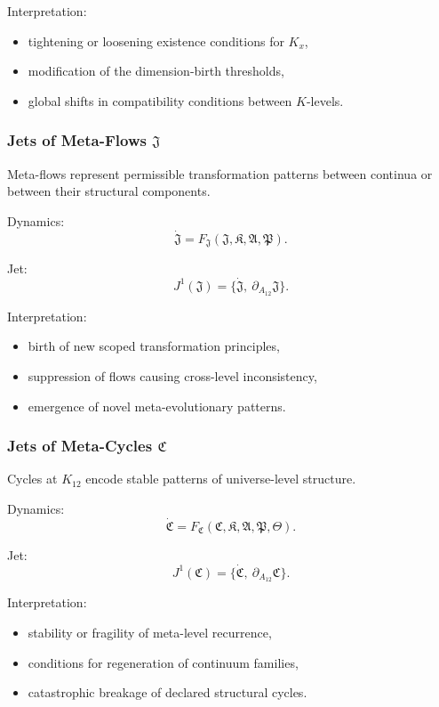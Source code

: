 Interpretation:
\begin{itemize}
    \item tightening or loosening existence conditions for $K_x$,
    \item modification of the dimension-birth thresholds,
    \item global shifts in compatibility conditions between $K$-levels.
\end{itemize}


\subsubsection{Jets of Meta-Flows $\mathfrak{J}$}

Meta-flows represent permissible transformation patterns between
continua or between their structural components.

Dynamics:
\[
\dot{\mathfrak{J}}
=
F_{\mathfrak{J}}(\mathfrak{J},\mathfrak{K},\mathfrak{A},\mathfrak{P}).
\]

Jet:
\[
J^1(\mathfrak{J})
= \{\dot{\mathfrak{J}},\ \partial_{A_{12}}\mathfrak{J}\}.
\]

Interpretation:
\begin{itemize}
    \item birth of new scoped transformation principles,
    \item suppression of flows causing cross-level inconsistency,
    \item emergence of novel meta-evolutionary patterns.
\end{itemize}


\subsubsection{Jets of Meta-Cycles $\mathfrak{C}$}

Cycles at $K_{12}$ encode stable patterns of universe-level structure.

Dynamics:
\[
\dot{\mathfrak{C}}
=
F_{\mathfrak{C}}(\mathfrak{C},\mathfrak{K},\mathfrak{A},\mathfrak{P},\mathfrak{\Theta}).
\]

Jet:
\[
J^1(\mathfrak{C})
= \{\dot{\mathfrak{C}},\ \partial_{A_{12}}\mathfrak{C}\}.
\]

Interpretation:
\begin{itemize}
    \item stability or fragility of meta-level recurrence,
    \item conditions for regeneration of continuum families,
    \item catastrophic breakage of declared structural cycles.
\end{itemize}


